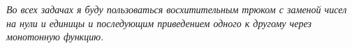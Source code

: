 \textit{Во всех задачах я буду пользоваться восхитительным трюком с заменой чисел на нули и единицы и последующим приведением одного к другому через монотонную функцию.}